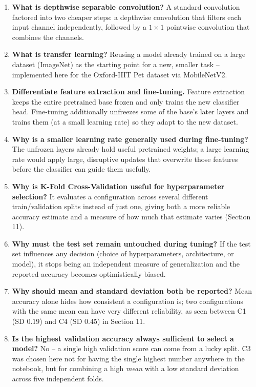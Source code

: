 \documentclass[10pt]{article}
\begin{document}
\begin{enumerate}
\item \textbf{What is depthwise separable convolution?}
A standard convolution factored into two cheaper steps: a depthwise
convolution that filters each input channel independently, followed by
a $1\times1$ pointwise convolution that combines the channels.

\item \textbf{What is transfer learning?}
Reusing a model already trained on a large dataset (ImageNet) as the
starting point for a new, smaller task -- implemented here for the
Oxford-IIIT Pet dataset via MobileNetV2.

\item \textbf{Differentiate feature extraction and fine-tuning.}
Feature extraction keeps the entire pretrained base frozen and only
trains the new classifier head. Fine-tuning additionally unfreezes
some of the base's later layers and trains them (at a small learning
rate) so they adapt to the new dataset.

\item \textbf{Why is a smaller learning rate generally used during fine-tuning?}
The unfrozen layers already hold useful pretrained weights; a large
learning rate would apply large, disruptive updates that overwrite
those features before the classifier can guide them usefully.

\item \textbf{Why is K-Fold Cross-Validation useful for hyperparameter selection?}
It evaluates a configuration across several different train/validation
splits instead of just one, giving both a more reliable accuracy
estimate and a measure of how much that estimate varies (Section 11).

\item \textbf{Why must the test set remain untouched during tuning?}
If the test set influences any decision (choice of hyperparameters,
architecture, or model), it stops being an independent measure of
generalization and the reported accuracy becomes optimistically
biased.

\item \textbf{Why should mean and standard deviation both be reported?}
Mean accuracy alone hides how consistent a configuration is; two
configurations with the same mean can have very different reliability,
as seen between C1 (SD $0.19$) and C4 (SD $0.45$) in Section 11.

\item \textbf{Is the highest validation accuracy always sufficient to select a model?}
No -- a single high validation score can come from a lucky split. C3
was chosen here not for having the single highest number anywhere in
the notebook, but for combining a high \emph{mean} with a low standard
deviation across five independent folds.
\end{enumerate}
\end{document}
